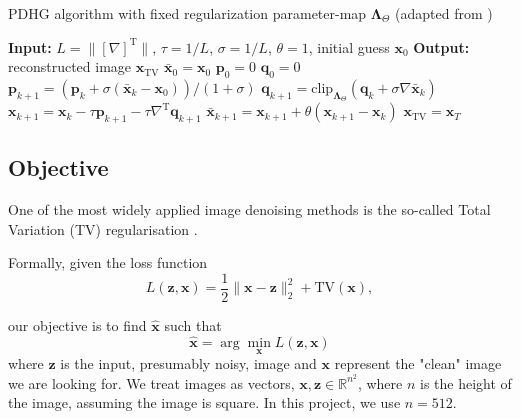 \documentclass[12pt]{article}
\begin{document}
\begin{algorithm}
\caption{PDHG algorithm with fixed regularization parameter-map $\boldsymbol{\Lambda}_\Theta$ (adapted from \cite{81})}
\begin{algorithmic}[1]
\STATE \textbf{Input:} $L = \| [\nabla]^\text{T} \|$, $\tau = 1/L$, $\sigma = 1/L$, $\theta = 1$, initial guess $\mathbf{x}_0$
\STATE \textbf{Output:} reconstructed image $\mathbf{x}_{\text{TV}}$
\STATE $\bar{\mathbf{x}}_0 = \mathbf{x}_0$
\STATE $\mathbf{p}_0 = 0$
\STATE $\mathbf{q}_0 = 0$
    \STATE $\mathbf{p}_{k+1} = \left(\mathbf{p}_k + \sigma ( \bar{\mathbf{x}}_k - \mathbf{x}_0)\right) / (1 + \sigma)$
    \STATE $\mathbf{q}_{k+1} = \text{clip}_{\boldsymbol{\Lambda}_\Theta} \left(\mathbf{q}_k + \sigma \nabla \bar{\mathbf{x}}_k \right)$
    \STATE $\mathbf{x}_{k+1} = \mathbf{x}_k - \tau \mathbf{p}_{k+1} - \tau \nabla^\text{T} \mathbf{q}_{k+1}$
    \STATE $\bar{\mathbf{x}}_{k+1} = \mathbf{x}_{k+1} + \theta (\mathbf{x}_{k+1} - \mathbf{x}_k)$
\ENDFOR
\STATE $\mathbf{x}_{\text{TV}} = \mathbf{x}_T$
\end{algorithmic}
\end{algorithm}



\subsection{Objective}


One of the most widely applied image denoising methods is the so-called Total Variation (TV) regularisation \cite{kofler2023learning}.

Formally, given the loss function
\vspace{-3pt}
$$ L(\mathbf{z}, \mathbf{x}) = \frac{1}{2} \| \mathbf{x} - \mathbf{z} \|_2^2 + \text{TV}(\mathbf{x}), $$

our objective is to find $\hat{\mathbf{x}}$ such that
$$ \hat{\mathbf{x}} = \arg \min_{\mathbf{x}} L(\mathbf{z}, \mathbf{x}) $$
where $\mathbf{z}$ is the input, presumably noisy, image and $\mathbf{x}$ represent the "clean" image we are looking for. We treat images as vectors, $\mathbf{x}, \mathbf{z} \in \mathbb{R}^{n^2}$, where $n$ is the height of the image, assuming the image is square. In this project, we use $n = 512$.
\end{document}
